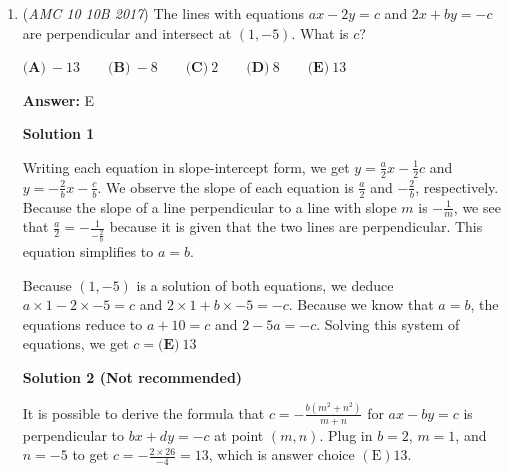 \begin{enumerate}
 Case 1: The contestant guesses zero questions correctly. 

 The probability of getting each question incorrect is $\frac{2}{3}$. Thus, the probability of getting all questions incorrect is $\frac{2}{3} * \frac{2}{3} * \frac{2}{3} = \frac{8}{27}$.

 Case 2: The contestant gets one question right. There are 3 ways the contestant can get one question correct since there are 3 questions. The probability of guessing correctly is $\frac{1}{3}$ so the probability of guessing one correctly and two incorrectly is $\frac{1}{3} * \frac{2}{3} * \frac{2}{3} = \frac{4}{27}$. Each of these 3 ways has a probability associated with it, so probability of getting 1 correct is $3 * \frac{4}{27} = \frac{4}{9}$

 The sum of the two cases is $\frac{8}{27} + \frac{4}{9} = \frac{20}{27}$. This is the complement of what we want so the answer is $1-\frac{20}{27} = \boxed{\textbf{(D)}\frac{7}{27}}$



	\item (\textit{AMC 10 10B 2017}) The lines with equations $ax-2y=c$ and $2x+by=-c$ are perpendicular and intersect at $(1, -5)$. What is $c$?


 $\textbf{(A)}\ -13\qquad\textbf{(B)}\ -8\qquad\textbf{(C)}\ 2\qquad\textbf{(D)}\ 8\qquad\textbf{(E)}\ 13$

 \textbf{Answer: }E



\textbf{Solution 1}

Writing each equation in slope-intercept form, we get $y=\frac{a}{2}x-\frac{1}{2}c$ and $y=-\frac{2}{b}x-\frac{c}{b}$. We observe the slope of each equation is $\frac{a}{2}$ and $-\frac{2}{b}$, respectively. Because the slope of a line perpendicular to a line with slope $m$ is $-\frac{1}{m}$, we see that $\frac{a}{2}=-\frac{1}{-\frac{2}{b}}$ because it is given that the two lines are perpendicular. This equation simplifies to $a=b$.

 Because $(1, -5)$ is a solution of both equations, we deduce $a \times 1-2 \times -5=c$ and $2 \times 1+b \times -5=-c$. Because we know that $a=b$, the equations reduce to $a+10=c$ and $2-5a=-c$. Solving this system of equations, we get $c=\boxed{\textbf{(E)}\ 13}$




\textbf{Solution 2 (Not recommended)}

It is possible to derive the formula that $c=-\frac{b(m^2+n^2)}{m+n}$ for $ax-by = c$ is perpendicular to $bx+dy=-c$ at point $(m,n)$. Plug in $b=2$, $m=1$, and $n=-5$ to get $c=-\frac{2 \times 26}{-4} = 13$, which is answer choice $(\text{E}) 13$.


\end{enumerate}
